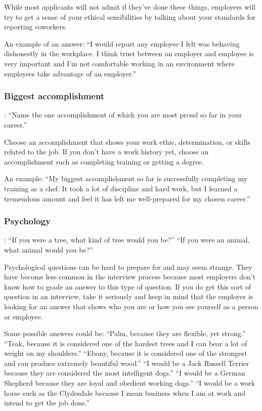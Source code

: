 While most applicants will not admit if they've done these things, employers will try to get a sense of your ethical sensibilities by talking about your standards for reporting coworkers.

An example of an answer:
\break ``I would report any employee I felt was behaving dishonestly in the workplace. I think trust between an employer and employee is very important and I'm not comfortable working in an environment where employees take advantage of an employer.''

\subsubsection*{Biggest accomplishment}:
\break ``Name the one accomplishment of which you are most proud so far in your career.''

Choose an accomplishment that shows your work ethic, determination, or skills related to the job. If you don't have a work history yet, choose an accomplishment such as completing training or getting a degree.

An example:
\break ``My biggest accomplishment so far is successfully completing my training as a chef. It took a lot of discipline and hard work, but I learned a tremendous amount and feel it has left me well-prepared for my chosen career.''

\subsubsection*{Psychology}: ``If you were a tree, what kind of tree would you be?'' ``If you were an animal, what animal would you be?''

Psychological questions can be hard to prepare for and may seem strange. They have become less common in the interview process because most employers don't know how to grade an answer to this type of question. If you do get this sort of question in an interview, take it seriously and keep in mind that the employer is looking for an answer that shows who you are or how you see yourself as a person or employee.

Some possible answers could be:
\break ``Palm, because they are flexible, yet strong.''
\break ``Teak, because it is considered one of the hardest trees and I can bear a lot of weight on my shoulders.''
\break ``Ebony, because it is considered one of the strongest and can produce extremely beautiful wood.''
\break ``I would be a Jack Russell Terrier because they are considered the most intelligent dogs.''
\break ``I would be a German Shepherd because they are loyal and obedient working dogs.''
\break ``I would be a work horse such as the Clydesdale because I mean business when I am at work and intend to get the job done.''


